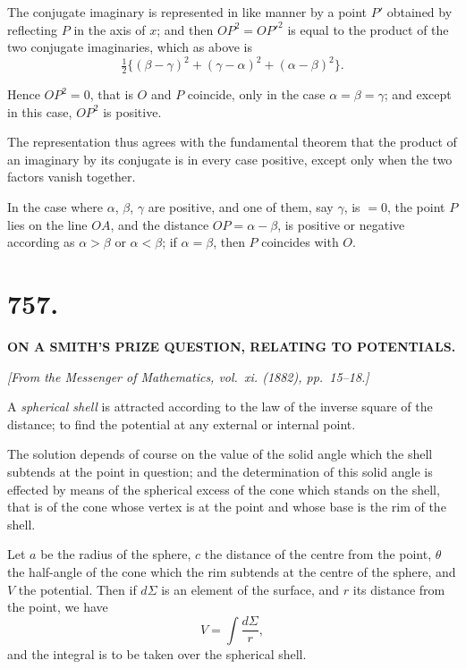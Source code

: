 \documentclass[11pt,a4paper]{book}
\begin{document}
The conjugate imaginary is represented in like manner by a point $P'$
obtained by reflecting $P$ in the axis of $x$; and then $OP^2 = OP'^2$ is equal
to the product of the two conjugate imaginaries, which as above is
%
\[
\tfrac{1}{2}\{ (\beta-\gamma)^2 + (\gamma-\alpha)^2 + (\alpha-\beta)^2 \}.
\]

Hence $OP^2 = 0$, that is $O$ and $P$ coincide, only in the case $\alpha = \beta = \gamma$;
and except in this case, $OP^2$ is positive.

The representation thus agrees with the fundamental theorem that the
product of an imaginary by its conjugate is in every case positive, except
only when the two factors vanish together.

In the case where $\alpha$, $\beta$, $\gamma$ are positive, and one of them, say $\gamma$, is $=0$,
the point $P$ lies on the line $OA$, and the distance $OP = \alpha - \beta$, is positive
or negative according as $\alpha > \beta$ or $\alpha < \beta$; if $\alpha = \beta$, then $P$ coincides with $O$.

\newpage


\section*{757.}

\begin{center}
\textbf{ON A SMITH'S PRIZE QUESTION, RELATING TO POTENTIALS.}
\end{center}

\begin{flushright}
\textit{[From the Messenger of Mathematics, vol.~xi. (1882), pp.~15--18.]}
\end{flushright}

A \textit{spherical shell} is attracted according to the law of the inverse square
of the distance; to find the potential at any external or internal point.

The solution depends of course on the value of the solid angle which the
shell subtends at the point in question; and the determination of this solid
angle is effected by means of the spherical excess of the cone which stands
on the shell, that is of the cone whose vertex is at the point and whose base
is the rim of the shell.

Let $a$ be the radius of the sphere, $c$ the distance of the centre from the
point, $\theta$ the half-angle of the cone which the rim subtends at the centre of
the sphere, and $V$ the potential. Then if $d\Sigma$ is an element of the surface,
and $r$ its distance from the point, we have
%
\[
V = \int \frac{d\Sigma}{r},
\]
%
and the integral is to be taken over the spherical shell.
\end{document}
